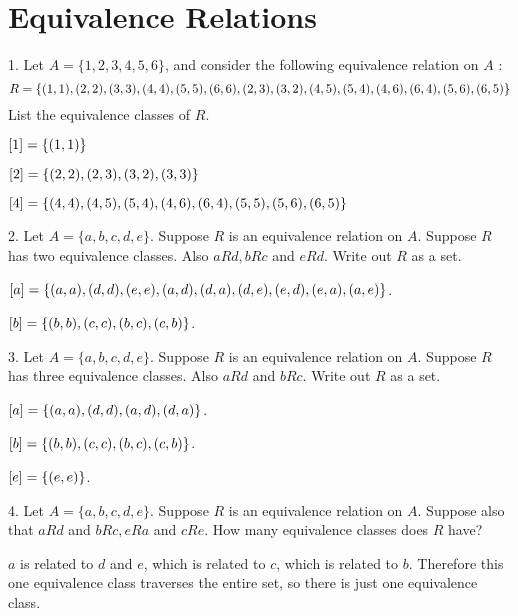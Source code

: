 \documentclass{article}
\begin{document}
\section{Equivalence Relations}
\begin{exercise}{}{}{1. Let $A=\{1,2,3,4,5,6\}$, and consider the following
		equivalence relation on $A$ :
		\[
			R=\{(1,1),(2,2),(3,3),(4,4),(5,5),(6,6),(2,3),(3,2),(4,5),(5,4),(4,6),(6,4),(5,6),(6,5)\}
		\]
		List the equivalence classes of $R$.
	}
	\begin{alist}
		\item $[1]=\{(1, 1)\}$
		\item $[2]=\{(2, 2), (2, 3), (3, 2), (3, 3)\}$
		\item $[4]=\{(4, 4), (4, 5), (5, 4), (4, 6), (6, 4), (5,5), (5, 6), (6, 5) \}$
	\end{alist}
\end{exercise}{}{}

\begin{exercise}{}{}{2. Let $A=\{a, b, c, d, e\}$. Suppose $R$ is an equivalence
		relation on $A$. Suppose $R$ has two equivalence classes. Also $a R d, b R
			c$ and $e R d$. Write out $R$ as a set.}
	\begin{alist}
		\item $[a] = \{(a, a), (d, d), (e, e), (a, d), (d, a), (d, e), (e, d), (e,
				a), (a, e)\}$.
		\item $[b] = \{(b, b), (c, c), (b, c), (c, b)\}$.
	\end{alist}
\end{exercise}{}{}

\begin{exercise}{}{}{3. Let $A=\{a, b, c, d, e\}$. Suppose $R$ is an equivalence
		relation on $A$. Suppose $R$ has three equivalence classes. Also $a R d$ and $b
			R c$. Write out $R$ as a set.}
	\begin{alist}
		\item $[a] = \{(a, a), (d, d), (a, d), (d, a)\}$.
		\item $[b] = \{(b, b), (c, c), (b, c), (c, b)\}$.
		\item $[e] = \{(e, e)\}$.
	\end{alist}
\end{exercise}{}{}

\begin{exercise}{}{}{4. Let $A=\{a, b, c, d, e\}$. Suppose $R$ is an equivalence
		relation on $A$. Suppose also that $a R d$ and $b R c, e R a$ and $c R e$. How
		many equivalence classes does $R$ have?}
	\begin{alist}
		\item $a$ is related to $d$ and $e$, which is related to $c$, which is related
		to $b$. Therefore this one equivalence class traverses the entire set, so
		there is just one equivalence class.
	\end{alist}
\end{exercise}{}{}
\end{document}
